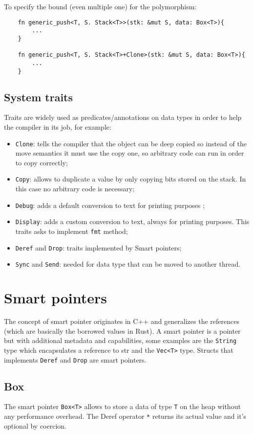 To specify the bound (even multiple one) for the polymorphism:
\begin{verbatim}
    fn generic_push<T, S. Stack<T>>(stk: &mut S, data: Box<T>){
        ...
    }

    fn generic_push<T, S. Stack<T>+Clone>(stk: &mut S, data: Box<T>){
        ...
    }
\end{verbatim}

\subsection{System traits}
Traits are widely used as predicates/annotations on data types in order to help the compiler in its job, for example:
\begin{itemize}
    \item \verb|Clone|: tells the compiler that the object can be deep copied so instead of the move semantics it must use the copy one, so arbitrary code can run in order to copy correctly;
    \item \verb|Copy|: allows to duplicate a value by only copying bits stored on the stack.
    In this case no arbitrary code is necessary;
    \item \verb|Debug|: adds a default conversion to text for printing purposes ;
    \item \verb|Display|: adds a custom conversion to text, always for printing purposes.
    This traits asks to implement \verb|fmt| method;
    \item \verb|Deref| and \verb|Drop|: traits implemented by Smart pointers;
    \item \verb|Sync| and \verb|Send|: needed for data type that can be moved to another thread.
\end{itemize}

\section{Smart pointers}
The concept of smart pointer originates in C++ and generalizes the references (which are basically the borrowed values in Rust).
A smart pointer is a pointer but with additional metadata and capabilities, some examples are the \verb|String| type which encapsulates a reference to str and the \verb|Vec<T>| type.
Structs that implements \verb|Deref| and \verb|Drop| are smart pointers.

\subsection{Box}
The smart pointer \verb|Box<T>| allows to store a data of type \verb|T| on the heap without any performance overhead.
The Deref operator \verb|*| returns its actual value and it's optional by coercion.

